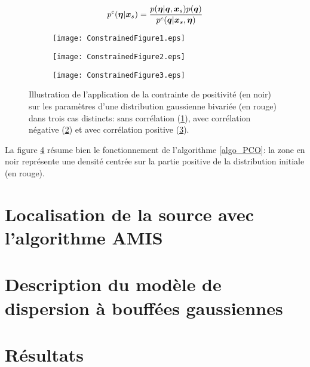 \begin{equation}
p^c({\bm{\eta}} | {\bm{x}_s}) = \dfrac{p({\bm{\eta}} | {\bm{q}}, {\bm{x}_s})p({\bm{q}})}{p^c({\bm{q}} | {\bm{x}_s}, {\bm{\eta}})}
\label{eq_AE_17}
\end{equation}


 \begin{figure}[h]
 	\centering
 	\begin{subfigure}[t]{0.5\textwidth}
 		\centering
		\texttt{[image: ConstrainedFigure1.eps]}
		\caption{}
 		\label{fig_AE_2_a}
 	\end{subfigure}%
 	\begin{subfigure}[t]{0.5\textwidth}
 		\centering
		\texttt{[image: ConstrainedFigure2.eps]}
		\caption{}
 		\label{fig_AE_2_b}
 	\end{subfigure}
 	\begin{subfigure}[t]{0.5\textwidth}
 		\centering
 		\texttt{[image: ConstrainedFigure3.eps]}
 		\caption{}
 		\label{fig_AE_2_c}
 	\end{subfigure} 
 	\label{fig_AE_2}	
 	\caption{Illustration de l'application de la contrainte de positivité (en noir) sur les paramètres d'une distribution gaussienne bivariée (en rouge) dans trois cas distincts: sans corrélation (\ref{fig_AE_2_a}), avec corrélation négative (\ref{fig_AE_2_b}) et avec corrélation positive (\ref{fig_AE_2_c}).}
 \end{figure}

La figure \ref{fig_AE_2} résume bien le fonctionnement de l'algorithme \ref{algo_PCO}: la zone en noir représente une densité centrée sur la partie positive de la distribution initiale (en rouge). 

\section{Localisation de la source avec l'algorithme AMIS}

\section{Description du modèle de dispersion à bouffées gaussiennes}

\section{Résultats}